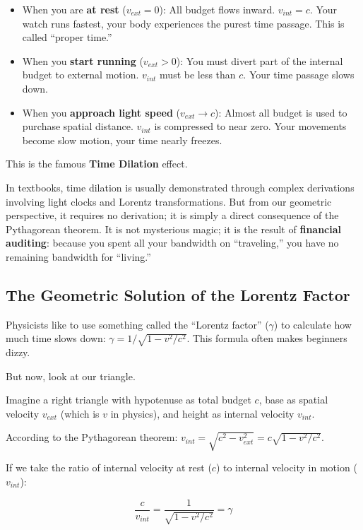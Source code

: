 \documentclass[11pt,a4paper,twoside]{book}
\begin{document}
\begin{itemize}
\item When you are \textbf{at rest} ($v_{ext} = 0$): All budget flows inward. $v_{int} = c$. Your watch runs fastest, your body experiences the purest time passage. This is called ``proper time.''

\item When you \textbf{start running} ($v_{ext} > 0$): You must divert part of the internal budget to external motion. $v_{int}$ must be less than $c$. Your time passage slows down.

\item When you \textbf{approach light speed} ($v_{ext} \to c$): Almost all budget is used to purchase spatial distance. $v_{int}$ is compressed to near zero. Your movements become slow motion, your time nearly freezes.
\end{itemize}

This is the famous \textbf{Time Dilation} effect.

In textbooks, time dilation is usually demonstrated through complex derivations involving light clocks and Lorentz transformations. But from our geometric perspective, it requires no derivation; it is simply a direct consequence of the Pythagorean theorem. It is not mysterious magic; it is the result of \textbf{financial auditing}: because you spent all your bandwidth on ``traveling,'' you have no remaining bandwidth for ``living.''

\subsection{The Geometric Solution of the Lorentz Factor}

Physicists like to use something called the ``Lorentz factor'' ($\gamma$) to calculate how much time slows down: $\gamma = 1/\sqrt{1-v^2/c^2}$. This formula often makes beginners dizzy.

But now, look at our triangle.

Imagine a right triangle with hypotenuse as total budget $c$, base as spatial velocity $v_{ext}$ (which is $v$ in physics), and height as internal velocity $v_{int}$.

According to the Pythagorean theorem: $v_{int} = \sqrt{c^2 - v_{ext}^2} = c \sqrt{1 - v^2/c^2}$.

If we take the ratio of internal velocity at rest ($c$) to internal velocity in motion ($v_{int}$):

$$\frac{c}{v_{int}} = \frac{1}{\sqrt{1-v^2/c^2}} = \gamma$$
\end{document}
